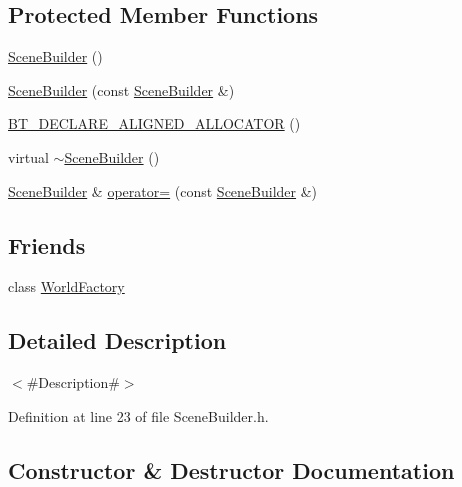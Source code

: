 \subsection*{Protected Member Functions}
\begin{DoxyCompactItemize}
\item 
\mbox{\hyperlink{classnjli_1_1_scene_builder_aefa2147c696bf2edee0274f20fbf96a0}{Scene\+Builder}} ()
\item 
\mbox{\hyperlink{classnjli_1_1_scene_builder_a4874af1675ba7d22de8af89a03df7a91}{Scene\+Builder}} (const \mbox{\hyperlink{classnjli_1_1_scene_builder}{Scene\+Builder}} \&)
\item 
\mbox{\hyperlink{classnjli_1_1_scene_builder_a36a05627709826877824957228140eed}{B\+T\+\_\+\+D\+E\+C\+L\+A\+R\+E\+\_\+\+A\+L\+I\+G\+N\+E\+D\+\_\+\+A\+L\+L\+O\+C\+A\+T\+OR}} ()
\item 
virtual \mbox{\hyperlink{classnjli_1_1_scene_builder_a87cb465f0c0593b647fb84383c7e9da2}{$\sim$\+Scene\+Builder}} ()
\item 
\mbox{\hyperlink{classnjli_1_1_scene_builder}{Scene\+Builder}} \& \mbox{\hyperlink{classnjli_1_1_scene_builder_aa7c6d3a968512f28f965f73bfcd73908}{operator=}} (const \mbox{\hyperlink{classnjli_1_1_scene_builder}{Scene\+Builder}} \&)
\end{DoxyCompactItemize}
\subsection*{Friends}
\begin{DoxyCompactItemize}
\item 
class \mbox{\hyperlink{classnjli_1_1_scene_builder_acb96ebb09abe8f2a37a915a842babfac}{World\+Factory}}
\end{DoxyCompactItemize}


\subsection{Detailed Description}
$<$\#\+Description\#$>$ 

Definition at line 23 of file Scene\+Builder.\+h.



\subsection{Constructor \& Destructor Documentation}
\mbox{\label{classnjli_1_1_scene_builder_aefa2147c696bf2edee0274f20fbf96a0}} 
